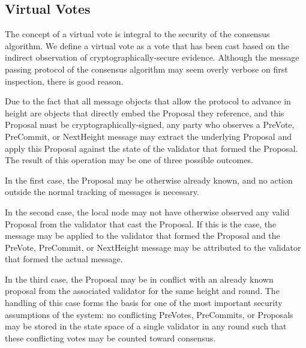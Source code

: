 \subsection{Virtual Votes}

The concept of a virtual vote is integral to the security of the
\LayerTwo{} consensus algorithm.
We define a virtual vote as a vote that has been cast based on the
indirect observation of cryptographically-secure evidence.
Although the message passing protocol of the consensus algorithm may
seem overly verbose on first inspection, there is good reason.

Due to the fact that all message objects that allow the protocol to
advance in height are objects that directly embed the Proposal they
reference, and this Proposal must be cryptographically-signed, any
party who observes a PreVote, PreCommit, or NextHeight message may
extract the underlying Proposal and apply this Proposal against the
state of the validator that formed the Proposal.
The result of this operation may be one of three possible outcomes.

In the first case, the Proposal may be otherwise already known, and no
action outside the normal tracking of messages is necessary.

In the second case, the local node may not have otherwise observed any
valid Proposal from the validator that cast the Proposal.
If this is the case, the message may be applied to the validator that
formed the Proposal and the PreVote, PreCommit, or NextHeight message
may be attributed to the validator that formed the actual message.

In the third case, the Proposal may be in conflict with an already
known proposal from the associated validator for the same height and
round.
The handling of this case forms the basis for one of the most important
security assumptions of the system: no conflicting PreVotes,
PreCommits, or Proposals may be stored in the state space of a single
validator in any round such that these conflicting votes may be counted
toward consensus.

